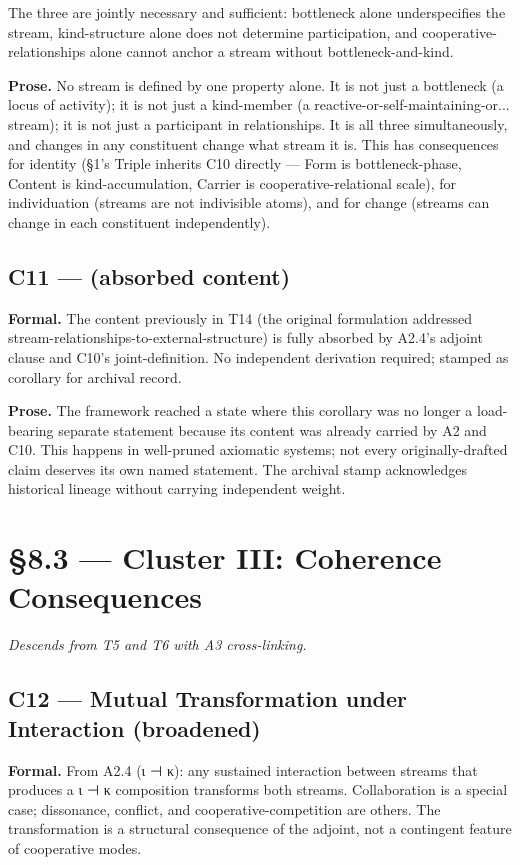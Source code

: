 \documentclass[11pt, openany]{book}
\newcommand{\sectionbreak}{\clearpage}
\begin{document}
The three are jointly necessary and sufficient: bottleneck alone underspecifies the stream, kind-structure alone does not determine participation, and cooperative-relationships alone cannot anchor a stream without bottleneck-and-kind.

\textbf{Prose.} No stream is defined by one property alone. It is not just a bottleneck (a locus of activity); it is not just a kind-member (a reactive-or-self-maintaining-or... stream); it is not just a participant in relationships. It is all three simultaneously, and changes in any constituent change what stream it is. This has consequences for identity (§1's Triple inherits C10 directly --- Form is bottleneck-phase, Content is kind-accumulation, Carrier is cooperative-relational scale), for individuation (streams are not indivisible atoms), and for change (streams can change in each constituent independently).

\subsection{C11 --- (absorbed content)}

\textbf{Formal.} The content previously in T14 (the original formulation addressed stream-relationships-to-external-structure) is fully absorbed by A2.4's adjoint clause and C10's joint-definition. No independent derivation required; stamped as corollary for archival record.

\textbf{Prose.} The framework reached a state where this corollary was no longer a load-bearing separate statement because its content was already carried by A2 and C10. This happens in well-pruned axiomatic systems; not every originally-drafted claim deserves its own named statement. The archival stamp acknowledges historical lineage without carrying independent weight.

\sectionbreak

\section{§8.3 --- Cluster III: Coherence Consequences}

\textit{Descends from T5 and T6 with A3 cross-linking.}

\subsection{C12 --- Mutual Transformation under Interaction (broadened)}

\textbf{Formal.} From A2.4 (ι ⊣ κ): any sustained interaction between streams that produces a ι ⊣ κ composition transforms both streams. Collaboration is a special case; dissonance, conflict, and cooperative-competition are others. The transformation is a structural consequence of the adjoint, not a contingent feature of cooperative modes.
\end{document}
